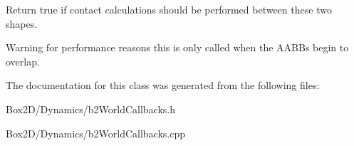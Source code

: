 Return true if contact calculations should be performed between these two shapes. \begin{DoxyWarning}{Warning}
for performance reasons this is only called when the A\+A\+B\+Bs begin to overlap. 
\end{DoxyWarning}


The documentation for this class was generated from the following files\+:\begin{DoxyCompactItemize}
\item 
Box2\+D/\+Dynamics/b2\+World\+Callbacks.\+h\item 
Box2\+D/\+Dynamics/b2\+World\+Callbacks.\+cpp\end{DoxyCompactItemize}
